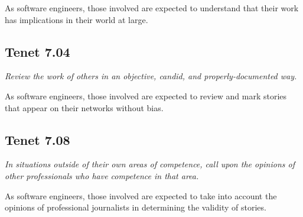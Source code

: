 As software engineers, those involved are expected to understand that their work has implications in their world at large.

\subsection{Tenet 7.04}

\emph{Review the work of others in an objective, candid, and properly-documented way. \cite{se_code}}

As software engineers, those involved are expected to review and mark stories that appear on their networks without bias.

\subsection{Tenet 7.08}

\emph{In situations outside of their own areas of competence, call upon the opinions of other professionals who have competence in that area. \cite{se_code}}

As software engineers, those involved are expected to take into account the opinions of professional journalists in determining the validity of stories. 